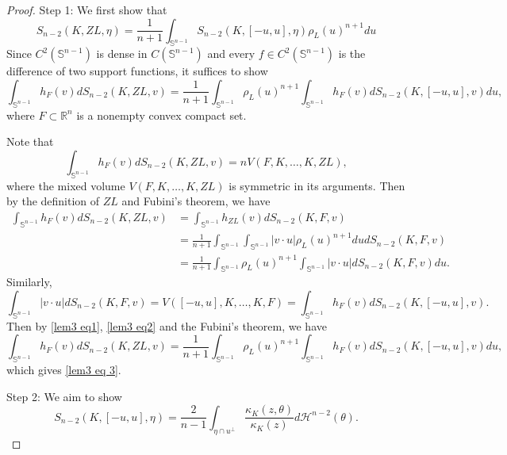 \documentclass[12pt, oneside,reqno]{amsart}
\numberwithin{equation}{section}
\newtheorem{definition and theorem}[theorem]{Definition and Theorem}
\theoremstyle{plain}
\theoremstyle{remark}
\theoremstyle{definition}
\newcommand{\sn}{{\mathbb S}^{n-1}}
\newcommand{\rn}{\mathbb R^n}
\newcommand{\tH}{\mathcal{H}}
\begin{document}
\begin{proof}
    Step 1: We first show that
    \begin{equation}\label{lem3 eq 3}
        S_{n-2}(K,ZL,\eta)=\frac{1}{n+1}\int_{\sn}S_{n-2}(K,[-u,u],\eta)\rho_L(u)^{n+1}du
    \end{equation}
    Since $C^2(\sn)$ is dense in $C(\sn)$ and every $f\in C^2(\sn)$ is the difference of two support functions, it suffices to show
    \[\int_{\sn}h_F(v)dS_{n-2}(K,ZL,v)=\frac{1}{n+1}\int_{\sn}\rho_L(u)^{n+1}\int_{\sn}h_F(v)dS_{n-2}(K,[-u,u],v)du,\]
    where $F\subset \rn$ is a nonempty convex compact set.

    Note that
    \[\int_{\sn}h_F(v)dS_{n-2}(K,ZL,v)=nV(F,K,\ldots, K, ZL),\]
    where the mixed volume $V(F,K,\ldots, K, ZL)$ is symmetric in its arguments. Then by the definition of $ZL$ and Fubini's theorem, we have
    \begin{equation}\label{lem3 eq1}
    \begin{aligned}
        \int_{\sn}h_F(v)dS_{n-2}(K,ZL,v)&=\int_{\sn}h_{ZL}(v)dS_{n-2}(K,F,v)\\
        &=\frac{1}{n+1}\int_{\sn}\int_{\sn}| v\cdot u |\rho_L(u)^{n+1}du dS_{n-2}(K,F,v)\\
        &=\frac{1}{n+1}\int_{\sn}\rho_L(u)^{n+1}\int_{\sn}| v\cdot u |dS_{n-2}(K,F,v)du.
    \end{aligned}
    \end{equation}
    Similarly, 
    \begin{equation}\label{lem3 eq2}
        \int_{\sn}| v\cdot u |dS_{n-2}(K,F,v)=V([-u,u], K,\ldots, K, F)=\int_{\sn}h_F(v)dS_{n-2}(K,[-u,u], v).
    \end{equation}
    Then by \eqref{lem3 eq1}, \eqref{lem3 eq2} and the Fubini's theorem, we have
    \[\int_{\sn}h_F(v)dS_{n-2}(K,ZL,v)=\frac{1}{n+1}\int_{\sn}\rho_L(u)^{n+1}\int_{\sn}h_F(v)dS_{n-2}(K,[-u,u],v)du,\]
    which gives \eqref{lem3 eq 3}.

    \noindent Step 2: We aim to show
    \[S_{n-2}(K,[-u,u],\eta)=\frac{2}{n-1}\int_{\eta\cap u^{\perp}}\frac{\kappa_K(z,\theta)}{\kappa_K(z)}d\tH^{n-2}(\theta).\]


\end{proof}
\end{document}
